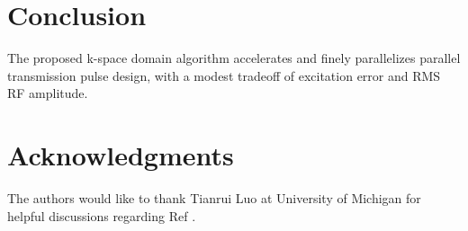 \section*{Conclusion}
The proposed k-space domain algorithm accelerates and finely parallelizes parallel transmission pulse design,
with a modest tradeoff of excitation error and RMS RF amplitude.


\section*{Acknowledgments}
The authors would like to thank Tianrui Luo at University of Michigan for helpful discussions regarding Ref \cite{luo2019grappa}.
